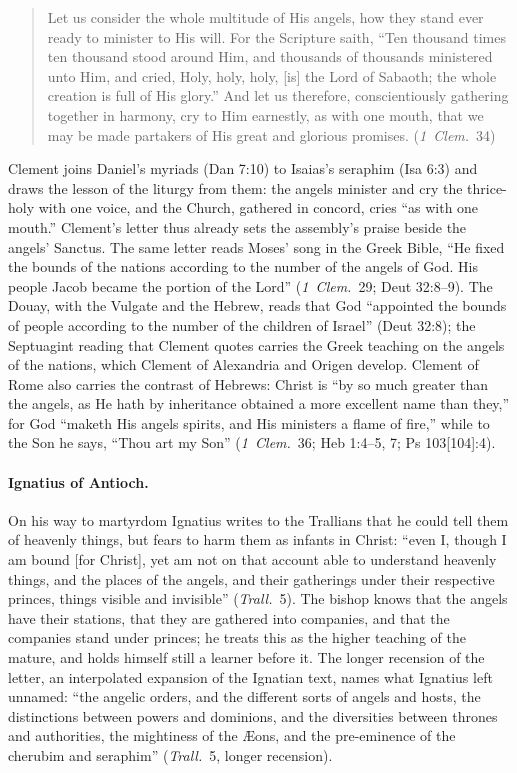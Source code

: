 \begin{quote}
Let us consider the whole multitude of His angels, how they stand ever
ready to minister to His will. For the Scripture saith, ``Ten thousand
times ten thousand stood around Him, and thousands of thousands
ministered unto Him, and cried, Holy, holy, holy, [is] the Lord of
Sabaoth; the whole creation is full of His glory.'' And let us therefore,
conscientiously gathering together in harmony, cry to Him earnestly, as
with one mouth, that we may be made partakers of His great and glorious
promises. (\emph{1~Clem.}\ 34)
\end{quote}

\noindent Clement joins Daniel's myriads (Dan 7:10) to Isaias's seraphim
(Isa 6:3) and draws the lesson of the liturgy from them: the angels
minister and cry the thrice-holy with one voice, and the Church, gathered
in concord, cries ``as with one mouth.'' Clement's letter thus already sets the assembly's praise beside the
angels' Sanctus. The same letter reads Moses' song in the Greek
Bible, ``He fixed the bounds of the nations according to the number of the
angels of God. His people Jacob became the portion of the Lord'' (\emph{1~Clem.}\ 29; Deut 32:8--9). The Douay, with the Vulgate and the Hebrew,
reads that God ``appointed the bounds of people according to the number of
the children of Israel'' (Deut 32:8); the Septuagint reading that Clement quotes carries the Greek teaching on
the angels of the nations, which Clement of Alexandria and Origen develop. Clement of
Rome also carries the contrast of Hebrews: Christ is ``by so much greater
than the angels, as He hath by inheritance obtained a more excellent name
than they,'' for God ``maketh His angels spirits, and His ministers a flame
of fire,'' while to the Son he says, ``Thou art my Son'' (\emph{1~Clem.}\
36; Heb 1:4--5, 7; Ps 103[104]:4).

\paragraph{Ignatius of Antioch.} On his way to martyrdom Ignatius writes to
the Trallians that he could tell them of heavenly things, but fears to
harm them as infants in Christ: ``even I, though I am bound [for Christ],
yet am not on that account able to understand heavenly things, and the
places of the angels, and their gatherings under their respective
princes, things visible and invisible'' (\emph{Trall.}\ 5). The bishop
knows that the angels have their stations, that they are gathered into
companies, and that the companies stand under princes; he treats this as
the higher teaching of the mature, and holds himself still a learner
before it. The longer recension of the letter, an interpolated expansion
of the Ignatian text, names what Ignatius left unnamed: ``the angelic
orders, and the different sorts of angels and hosts, the distinctions
between powers and dominions, and the diversities between thrones and
authorities, the mightiness of the \AE ons, and the pre-eminence of the
cherubim and seraphim'' (\emph{Trall.}\ 5, longer recension).

